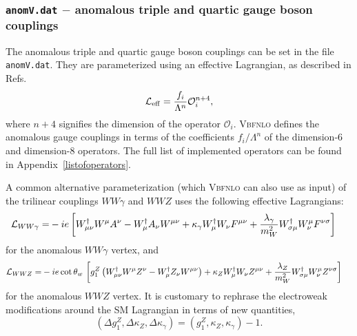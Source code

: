 \documentclass[english,12pt]{article}
\begin{document}


\subsubsection{{\tt anomV.dat} $-$ anomalous triple and quartic gauge
  boson couplings}
\label{sec:TGC}

The anomalous triple and quartic gauge boson couplings can be set in the file
{\tt anomV.dat}.  They are parameterized using an effective Lagrangian, as
described in Refs.~\cite{Buchmuller:1985jz, Hagiwara:1993ck, Eboli:2006wa, Degrande:2013rea}
\begin{equation}
 \mathcal{L}_{\rm eff} = \frac{f_{i}}{\Lambda^{n}} \mathcal{O}_{i}^{n+4},
\end{equation}
where $n+4$ signifies the dimension of the operator $\mathcal{O}_{i}$. 
\textsc{Vbfnlo} defines the anomalous gauge couplings in terms of the
coefficients $f_{i}/\Lambda^{n}$ of the dimension-6 and dimension-8 
operators. The full list of implemented operators can be found in 
Appendix~\ref{listofoperators}.

A common alternative parameterization (which \textsc{Vbfnlo} can also use as
input) of the trilinear couplings $WW\gamma$ and $WWZ$ uses the following
effective Lagrangians:
\begin{equation}
\begin{split}
\label{anovertex}
\mathcal{L}_{{{WW}}\gamma} =& -ie \left[ W_{\mu\nu}^\dagger W^\mu
A^\nu- W_\mu^\dagger A_\nu W^{\mu\nu} +\kappa_\gamma W_\mu^\dagger
W_\nu F^{\mu\nu} +{\lambda_\gamma\over m_W^2} W_{\sigma\mu}^\dagger
W^\mu_\nu F^{\nu\sigma}\right]\,
\end{split}
\end{equation}
for the anomalous $WW\gamma$ vertex, and
\begin{equation}
\begin{split}
\label{anovertexZ}
\mathcal{L}_{{{WWZ}}} = & -ie \cot \theta_w \,\left[ g_1^Z\left(
  W_{\mu\nu}^\dagger W^\mu Z^\nu- W_\mu^\dagger Z_\nu
  W^{\mu\nu}\right) +\kappa_Z W_\mu^\dagger W_\nu Z^{\mu\nu}
+{\lambda_Z\over m_W^2} W_{\sigma\mu}^\dagger W^\mu_\nu
Z^{\nu\sigma}\right]\,
\end{split}
\end{equation}
for the anomalous $WWZ$ vertex. It is customary to rephrase the
electroweak modifications around the SM Lagrangian in terms of new
quantities,
%
\begin{equation}
(\Delta g_1^Z,\Delta \kappa_Z, \Delta\kappa_\gamma) = ( g_1^Z,\kappa_Z,\kappa_\gamma) - 1 .
\end{equation}
\end{document}
